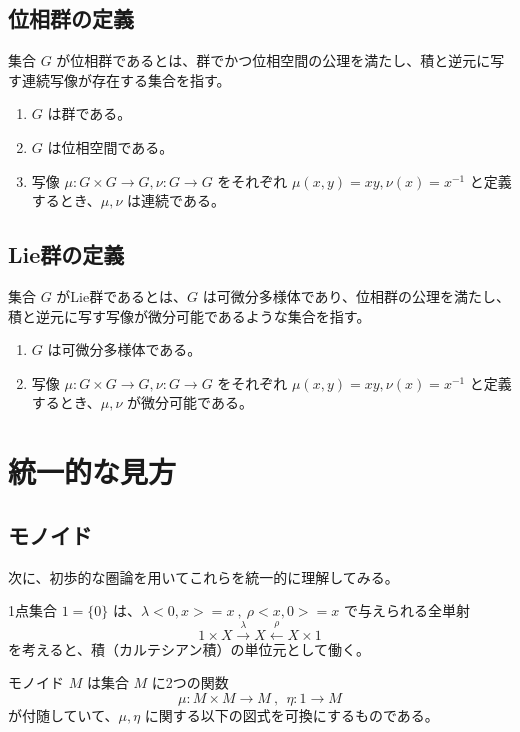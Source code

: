 \documentclass[uplatex,a4j,12pt,dvipdfmx]{jsarticle}
\begin{document}
\subsection{位相群の定義}

集合 $G$ が位相群であるとは、群でかつ位相空間の公理を満たし、積と逆元に写す連続写像が存在する集合を指す。

\begin{enumerate}
	\item $G$ は群である。
	\item $G$ は位相空間である。
	\item 写像 $\mu: G \times G \to G, \nu: G \to G$ をそれぞれ $\mu(x,y)=xy, \nu(x) = x^{-1}$ と定義するとき、$\mu,\nu$ は連続である。
\end{enumerate}

\subsection{Lie群の定義}

集合 $G$ がLie群であるとは、$G$ は可微分多様体であり、位相群の公理を満たし、積と逆元に写す写像が微分可能であるような集合を指す。

\begin{enumerate}
	\item $G$ は可微分多様体である。
	\item 写像 $\mu: G \times G \to G, \nu: G \to G$ をそれぞれ $\mu(x,y)=xy, \nu(x) = x^{-1}$ と定義するとき、$\mu,\nu$ が微分可能である。
\end{enumerate}


\section{統一的な見方}

\subsection{モノイド}

次に、初歩的な圏論を用いてこれらを統一的に理解してみる。

1点集合 $1 = \{ 0 \}$ は、$\lambda<0,x>=x \ , \ \rho<x,0> = x $ で与えられる全単射
$$
	1 \times X \xrightarrow{\lambda} X \xleftarrow{\rho} X \times 1
$$
を考えると、積（カルテシアン積）の単位元として働く。

モノイド $M$ は集合 $M$ に2つの関数
$$
	\mu : M \times M \to M \ , \ \ \eta : 1 \to M
$$
が付随していて、$\mu,\eta$ に関する以下の図式を可換にするものである。
\end{document}
